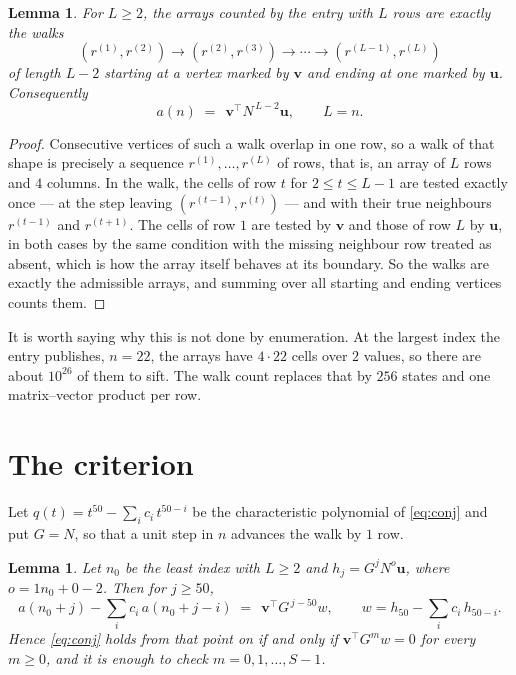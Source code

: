 \documentclass[11pt,a4paper]{article}
\theoremstyle{plain}
\newtheorem{lemma}[theorem]{Lemma}
\theoremstyle{definition}
\begin{document}
\begin{lemma}\label{lem:walk}
For $L\ge2$, the arrays counted by the entry with $L$ rows are exactly the walks
\[
(r^{(1)},r^{(2)})\to(r^{(2)},r^{(3)})\to\cdots\to(r^{(L-1)},r^{(L)})
\]
of length $L-2$ starting at a vertex marked by $\mathbf{v}$ and ending at one marked by
$\mathbf{u}$. Consequently
\[
a(n)\;=\;\,\mathbf{v}^{\!\top}N^{\,L-2}\mathbf{u},\qquad L=n .
\]
\end{lemma}

\begin{proof}
Consecutive vertices of such a walk overlap in one row, so a walk of that shape is
precisely a sequence $r^{(1)},\dots,r^{(L)}$ of rows, that is, an array of $L$ rows
and $4$ columns. In the walk, the cells of row $t$ for $2\le t\le L-1$ are tested
exactly once --- at the step leaving $(r^{(t-1)},r^{(t)})$ --- and with their true
neighbours $r^{(t-1)}$ and $r^{(t+1)}$. The cells of row $1$ are tested by
$\mathbf{v}$ and those of row $L$ by $\mathbf{u}$, in both cases by the same condition
with the missing neighbour row treated as absent, which is how the array itself behaves at
its boundary. So the walks are exactly the admissible arrays, and summing over all starting
and ending vertices counts them.
\end{proof}


It is worth saying why this is not done by enumeration. At the largest index the entry
publishes, $n=22$, the arrays have $4\cdot22$ cells over
$2$ values, so there are about $10^{26}$ of them to sift. The
walk count replaces that by $256$ states and one matrix--vector product per row.
\section{The criterion}

Let $q(t)=t^{50}-\sum_i c_i\,t^{50-i}$ be the characteristic polynomial of
\eqref{eq:conj} and put $G=N$, so that a unit step in $n$ advances the walk by
$1$ row.

\begin{lemma}\label{lem:crit}
Let $n_0$ be the least index with $L\ge2$ and $h_j=G^{j}N^{o}\mathbf{u}$, where
$o=1n_0+0-2$. Then for $j\ge50$,
\[
a(n_0+j)-\sum_i c_i\,a(n_0+j-i)\;=\;\,\mathbf{v}^{\!\top}G^{\,j-50}w,
\qquad w=h_{50}-\sum_i c_i\,h_{50-i} .
\]
Hence \eqref{eq:conj} holds from that point on if and only if
$\mathbf{v}^{\!\top}G^{m}w=0$ for every $m\ge0$, and it is enough to check
$m=0,1,\dots,S-1$.
\end{lemma}
\end{document}

